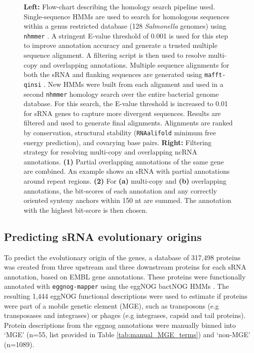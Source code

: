 \begin{figure}[H]
\caption[Flow-charts outlining the sRNA homology search pipeline, and the filtering strategy used to select homology search results]{\textbf{Left:} Flow-chart describing the homology search pipeline used. Single-sequence HMMs are used to search for homologous sequences within a genus restricted database (128 \textit{Salmonella} genomes) using \texttt{nhmmer} \citep{Wheeler2013-qxxw}. A stringent E-value threshold of 0.001 is used for this step to improve annotation accuracy and generate a trusted multiple sequence alignment. A filtering script is then used to resolve multi-copy and overlapping annotations. Multiple sequence alignments for both the sRNA and flanking sequences are generated using \texttt{mafft-qinsi} \citep{Katoh2013-wd}. New HMMs were built from each alignment and used in a second \texttt{nhmmer} homology search over the entire bacterial genome database. For this search, the E-value threshold is increased to 0.01 for sRNA genes to capture more divergent sequences. Results are filtered and used to generate final alignments. Alignments are ranked by conservation, structural stability (\texttt{RNAalifold} minimum free energy prediction), and covarying base pairs. \textbf{Right:} Filtering strategy for resolving multi-copy and overlapping ncRNA annotations. \textbf{(1)} Partial overlapping annotations of the same gene are combined. An example shows an sRNA with partial annotations around repeat regions. \textbf{(2)} For \textbf{(a)} multi-copy and \textbf{(b)} overlapping annotations, the bit-scores of each annotation and any correctly oriented synteny anchors within 150 nt are summed. The annotation with the highest bit-score is then chosen.}
\label{fig:pipeline_flowchart}
\end{figure}
\newpage
\subsection{Predicting sRNA evolutionary origins}

To predict the evolutionary origin of the genes, a database of 317,498 proteins was created from three upstream and three downstream proteins for each sRNA annotation, based on EMBL gene annotations. These proteins were functionally annotated with \texttt{eggnog-mapper} \citep{Huerta-Cepas2017-mp} using the eggNOG bactNOG HMMs \citep{Powell2012-of}. The resulting 1,444 eggNOG functional descriptions were used to estimate if proteins were part of a mobile genetic element (MGE), such as transposons (e.g transposases and integrases) or phages (e.g integrases, capsid and tail proteins). Protein descriptions from the eggnog annotations were manually binned into ‘MGE’ (n=55, list provided in Table \ref{tab:manual_MGE_terms}) and ‘non-MGE’ (n=1089).

